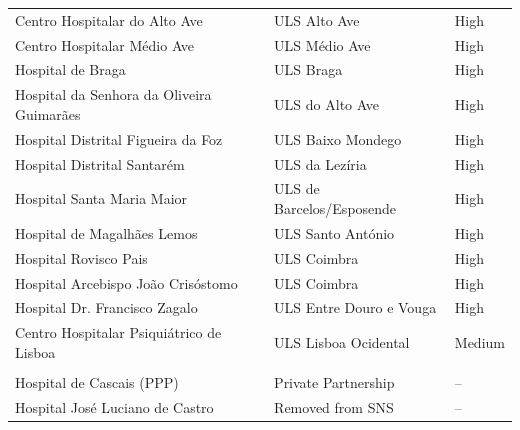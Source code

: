 \begin{longtable}{p{6cm}p{6cm}p{2cm}}
Centro Hospitalar do Alto Ave & ULS Alto Ave & High \\
Centro Hospitalar Médio Ave & ULS Médio Ave & High \\
Hospital de Braga & ULS Braga & High \\
Hospital da Senhora da Oliveira Guimarães & ULS do Alto Ave & High \\
Hospital Distrital Figueira da Foz & ULS Baixo Mondego & High \\
Hospital Distrital Santarém & ULS da Lezíria & High \\
Hospital Santa Maria Maior & ULS de Barcelos/Esposende & High \\
Hospital de Magalhães Lemos & ULS Santo António & High \\
Hospital Rovisco Pais & ULS Coimbra & High \\
Hospital Arcebispo João Crisóstomo & ULS Coimbra & High \\
Hospital Dr. Francisco Zagalo & ULS Entre Douro e Vouga & High \\
Centro Hospitalar Psiquiátrico de Lisboa & ULS Lisboa Ocidental & Medium \\
\addlinespace
\multicolumn{3}{l}{\textit{Excluded Entities}} \\
Hospital de Cascais (PPP) & Private Partnership & -- \\
Hospital José Luciano de Castro & Removed from SNS & -- \\

\end{longtable}
